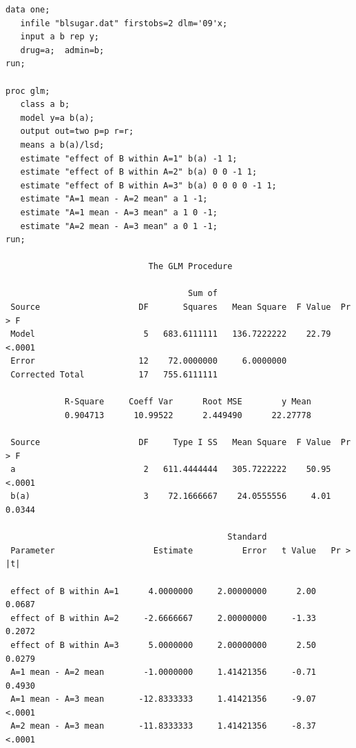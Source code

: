 \begin{large}
\begin{verbatim}
data one;
   infile "blsugar.dat" firstobs=2 dlm='09'x;
   input a b rep y;
   drug=a;  admin=b;
run;

proc glm;
   class a b;
   model y=a b(a);
   output out=two p=p r=r;
   means a b(a)/lsd;
   estimate "effect of B within A=1" b(a) -1 1; 
   estimate "effect of B within A=2" b(a) 0 0 -1 1; 
   estimate "effect of B within A=3" b(a) 0 0 0 0 -1 1; 
   estimate "A=1 mean - A=2 mean" a 1 -1; 
   estimate "A=1 mean - A=3 mean" a 1 0 -1; 
   estimate "A=2 mean - A=3 mean" a 0 1 -1; 
run;

                             The GLM Procedure

                                     Sum of
 Source                    DF       Squares   Mean Square  F Value  Pr > F
 Model                      5   683.6111111   136.7222222    22.79  <.0001
 Error                     12    72.0000000     6.0000000                 
 Corrected Total           17   755.6111111                               

            R-Square     Coeff Var      Root MSE        y Mean
            0.904713      10.99522      2.449490      22.27778

 Source                    DF     Type I SS   Mean Square  F Value  Pr > F
 a                          2   611.4444444   305.7222222    50.95  <.0001
 b(a)                       3    72.1666667    24.0555556     4.01  0.0344

                                             Standard
 Parameter                    Estimate          Error   t Value   Pr > |t|

 effect of B within A=1      4.0000000     2.00000000      2.00     0.0687
 effect of B within A=2     -2.6666667     2.00000000     -1.33     0.2072
 effect of B within A=3      5.0000000     2.00000000      2.50     0.0279
 A=1 mean - A=2 mean        -1.0000000     1.41421356     -0.71     0.4930
 A=1 mean - A=3 mean       -12.8333333     1.41421356     -9.07     <.0001
 A=2 mean - A=3 mean       -11.8333333     1.41421356     -8.37     <.0001
\end{verbatim}
\end{large}

